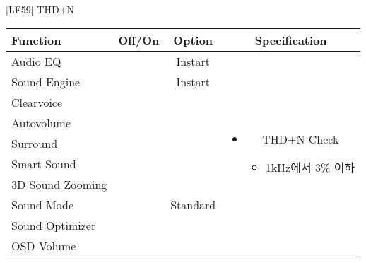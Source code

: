 \begin{frame}[t]{[LF59] THD+N}
\begin{tiny}
\begin{tabular}{@{}lccc@{}}
\toprule
Function & Off/On & Option & Specification \\
\midrule
Audio EQ & \color{black}{Off} & Instart &
\multirow{10}{60mm}{
\begin{itemize}
\item THD+N Check
	\begin{itemize}
	\item 1kHz에서 3\% 이하
	\end{itemize}
\end{itemize}
} \\
Sound Engine & \color{black}{Off} & Instart & \\
Clearvoice & \color{black}{Off} & & \\
Autovolume & \color{black}{Off} & & \\
Surround & \color{black}{Off} & & \\
Smart Sound & \color{black}{Off} & & \\
3D Sound Zooming & \color{black}{Off} & & \\
Sound Mode & \color{blue}{On} & Standard & \\
Sound Optimizer & \color{black}{Off} & & \\
OSD Volume & \color{blue}{On} & \color{blue}{Vol.100} & \\
\midrule
\end{tabular}
\end{tiny}

\end{frame}



